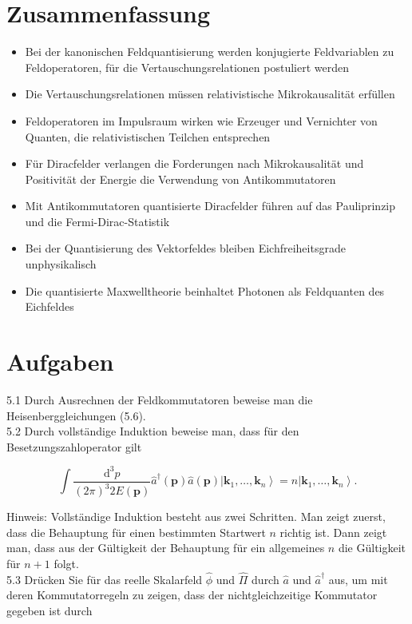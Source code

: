 \documentclass[10pt, letterpaper]{article}
\begin{document}
\section*{Zusammenfassung}
\begin{itemize}
  \item Bei der kanonischen Feldquantisierung werden konjugierte Feldvariablen zu Feldoperatoren, für die Vertauschungsrelationen postuliert werden
  \item Die Vertauschungsrelationen müssen relativistische Mikrokausalität erfüllen
  \item Feldoperatoren im Impulsraum wirken wie Erzeuger und Vernichter von Quanten, die relativistischen Teilchen entsprechen
  \item Für Diracfelder verlangen die Forderungen nach Mikrokausalität und Positivität der Energie die Verwendung von Antikommutatoren
  \item Mit Antikommutatoren quantisierte Diracfelder führen auf das Pauliprinzip und die Fermi-Dirac-Statistik
  \item Bei der Quantisierung des Vektorfeldes bleiben Eichfreiheitsgrade unphysikalisch
  \item Die quantisierte Maxwelltheorie beinhaltet Photonen als Feldquanten des Eichfeldes
\end{itemize}

\section*{Aufgaben}
5.1 Durch Ausrechnen der Feldkommutatoren beweise man die Heisenberggleichungen (5.6).\\
5.2 Durch vollständige Induktion beweise man, dass für den Besetzungszahloperator gilt

$$
\int \frac{\mathrm{d}^{3} p}{(2 \pi)^{3} 2 E(\mathbf{p})} \hat{a}^{\dagger}(\mathbf{p}) \hat{a}(\mathbf{p})\left|\mathbf{k}_{1}, \ldots, \mathbf{k}_{n}\right\rangle=n\left|\mathbf{k}_{1}, \ldots, \mathbf{k}_{n}\right\rangle .
$$

Hinweis: Vollständige Induktion besteht aus zwei Schritten. Man zeigt zuerst, dass die Behauptung für einen bestimmten Startwert $n$ richtig ist. Dann zeigt man, dass aus der Gültigkeit der Behauptung für ein allgemeines $n$ die Gültigkeit für $n+1$ folgt.\\
5.3 Drücken Sie für das reelle Skalarfeld $\hat{\phi}$ und $\hat{\Pi}$ durch $\hat{a}$ und $\hat{a}^{\dagger}$ aus, um mit deren Kommutatorregeln zu zeigen, dass der nichtgleichzeitige Kommutator gegeben ist durch
\end{document}
